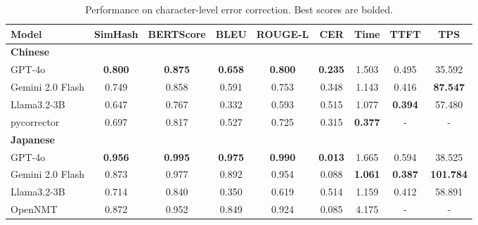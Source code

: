 \documentclass[10pt, a4paper]{article}
\begin{document}
\begin{table}[h]
\centering
\small
\begin{tabular}{lcccccccc}
\toprule
\textbf{Model} & \textbf{SimHash} & \textbf{BERTScore} & \textbf{BLEU} & \textbf{ROUGE-L} & \textbf{CER} & \textbf{Time} & \textbf{TTFT} & \textbf{TPS} \\
\midrule
\multicolumn{9}{l}{\textbf{Chinese}} \\
GPT-4o & \textbf{0.800} & \textbf{0.875} & \textbf{0.658} & \textbf{0.800} & \textbf{0.235} & 1.503 & 0.495 & 35.592 \\
Gemini 2.0 Flash & 0.749 & 0.858 & 0.591 & 0.753 & 0.348 & 1.143 & 0.416 & \textbf{87.547 } \\
Llama3.2-3B & 0.647 & 0.767 & 0.332 & 0.593 & 0.515 & 1.077 & \textbf{0.394} & 57.480 \\
{pycorrector} & 0.697 & 0.817 & 0.527 & 0.725 & 0.315 & \textbf{0.377} & - & - \\
\midrule
\multicolumn{9}{l}{\textbf{Japanese}} \\
GPT-4o & \textbf{0.956} & \textbf{0.995} & \textbf{0.975} & \textbf{0.990} & \textbf{0.013} & 1.665 & 0.594 & 38.525 \\
Gemini 2.0 Flash & 0.873 & 0.977 & 0.892 & 0.954 & 0.088 & \textbf{1.061} & \textbf{0.387} & \textbf{101.784} \\
Llama3.2-3B & 0.714 & 0.840 & 0.350 & 0.619 & 0.514 & 1.159 & 0.412 & 58.891 \\
{OpenNMT} & 0.872 & 0.952 & 0.849 & 0.924 & 0.085 & 4.175 & - & - \\
\bottomrule
\end{tabular}
\caption{Performance on character-level error correction. Best scores are bolded.}
\label{tab:char_correction_results}
\end{table}


\end{document}
